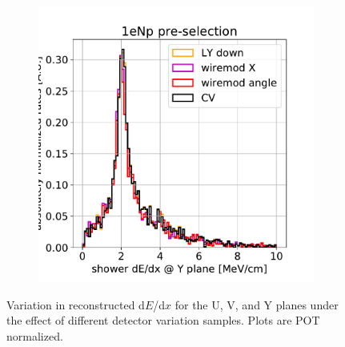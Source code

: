 \documentclass[a4paper]{article}
\begin{document}
\begin{figure}[H]
\begin{center}
\begin{subfigure}[b]{0.3\textwidth}
    \end{subfigure}
    \begin{subfigure}[b]{0.3\textwidth}
    \centering
    \includegraphics[width=1.00\textwidth]{detsys/shr_tkfit_dedx_Y01162020_eLEE_low.pdf}
    \end{subfigure}
\caption{\label{fig:detsys:dedx:eLEElow}Variation in reconstructed d$E$/d$x$ for the U, V, and Y planes under the effect of different detector variation samples. Plots are POT normalized.}
\end{center}
\end{figure}
\end{document}
